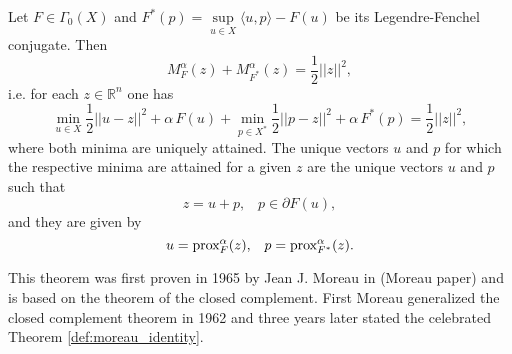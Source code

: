    \begin{theorem} %
    \label{def:moreau_identity}

        Let $F \in \Gamma_{0}(X)$ and $F^{\ast}(p) = \sup\limits_{u \in X} \langle u, p \rangle - F(u)$ be its Legendre-Fenchel conjugate. Then
            $$
                M^{\alpha}_{F}(z) + M^{\alpha}_{F^{\ast}}(z) = \frac{1}{2}||z||^{2},
            $$
        i.e. for each $z \in \mathbb{R}^{n}$ one has
            \begin{equation}
                \min_{u \in X} \frac{1}{2} ||u - z||^{2} +  \alpha \, F(u) + \min_{p \in X^{\ast}} \frac{1}{2} ||p - z||^{2} +  \alpha \, F^{\ast}(p) = \frac{1}{2}||z||^{2},
                \label{eq:moreau_identity}
            \end{equation}
        where both minima are uniquely attained. The unique vectors $u$ and $p$ for which the respective minima are attained for a given $z$ are the unique vectors $u$ and $p$ such that
            \begin{equation}
                z = u + p, \,\,\,\,\, p \in \partial F(u),
                \label{eq:equivalence_of_moreau_property}
            \end{equation}
        and they are given by
            $$
                u = \textnormal{prox}^{\alpha}_{F}(z), \,\,\,\,\, p = \textnormal{prox}^{\alpha}_{F^{\ast}}(z).
            $$
    \end{theorem}

    This theorem was first proven in 1965 by Jean J. Moreau in (Moreau paper) and is based on the theorem of the closed complement. First Moreau generalized the closed complement theorem in 1962 and three years later stated the celebrated Theorem \ref{def:moreau_identity}.

